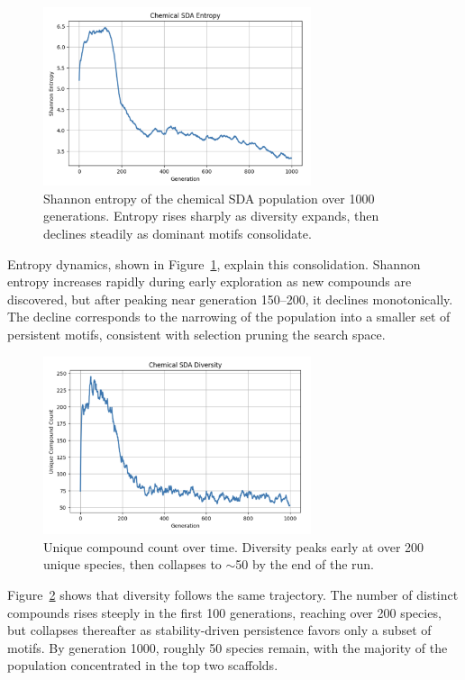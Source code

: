 \documentclass[life,article,submit,pdftex,moreauthors]{Definitions/mdpi}
\begin{document}
\begin{figure}[H]
    \centering
    \includegraphics[width=0.7\textwidth]{SDA-chem-entropy.png}
    \caption{Shannon entropy of the chemical SDA population over 1000 generations. Entropy rises sharply as diversity expands, then declines steadily as dominant motifs consolidate.}
    \label{fig:chem-entropy}
\end{figure}

Entropy dynamics, shown in Figure~\ref{fig:chem-entropy}, explain this consolidation. Shannon entropy increases rapidly during early exploration as new compounds are discovered, but after peaking near generation 150--200, it declines monotonically. The decline corresponds to the narrowing of the population into a smaller set of persistent motifs, consistent with selection pruning the search space.  

\begin{figure}[H]
    \centering
    \includegraphics[width=0.7\textwidth]{SDA-chem-diversity.png}
    \caption{Unique compound count over time. Diversity peaks early at over 200 unique species, then collapses to $\sim$50 by the end of the run.}
    \label{fig:chem-diversity}
\end{figure}

Figure~\ref{fig:chem-diversity} shows that diversity follows the same trajectory. The number of distinct compounds rises steeply in the first 100 generations, reaching over 200 species, but collapses thereafter as stability-driven persistence favors only a subset of motifs. By generation 1000, roughly 50 species remain, with the majority of the population concentrated in the top two scaffolds.  
\end{document}
